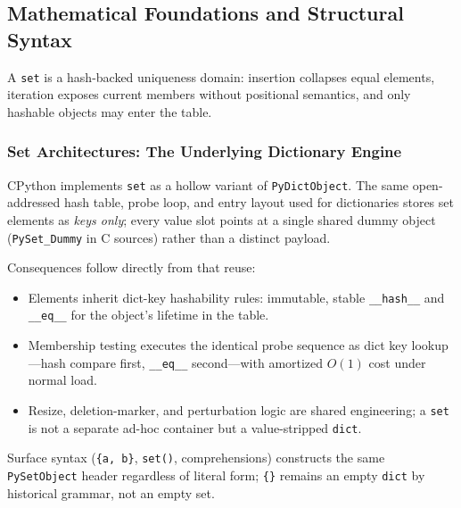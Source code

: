 \subsection{Mathematical Foundations and Structural Syntax}

A \texttt{set} is a hash-backed uniqueness domain: insertion collapses equal elements, iteration exposes current members without positional semantics, and only hashable objects may enter the table.

\subsubsection{Set Architectures: The Underlying Dictionary Engine}

CPython implements \texttt{set} as a hollow variant of \texttt{PyDictObject}. The same open-addressed hash table, probe loop, and entry layout used for dictionaries stores set elements as \emph{keys only}; every value slot points at a single shared dummy object (\texttt{PySet\_Dummy} in C sources) rather than a distinct payload.

Consequences follow directly from that reuse:

\begin{itemize}
    \item Elements inherit dict-key hashability rules: immutable, stable \texttt{\_\_hash\_\_} and \texttt{\_\_eq\_\_} for the object's lifetime in the table.
    \item Membership testing executes the identical probe sequence as dict key lookup---hash compare first, \texttt{\_\_eq\_\_} second---with amortized $O(1)$ cost under normal load.
    \item Resize, deletion-marker, and perturbation logic are shared engineering; a \texttt{set} is not a separate ad-hoc container but a value-stripped \texttt{dict}.
\end{itemize}

Surface syntax (\texttt{\{a, b\}}, \texttt{set()}, comprehensions) constructs the same \texttt{PySetObject} header regardless of literal form; \texttt{\{\}} remains an empty \texttt{dict} by historical grammar, not an empty set.
